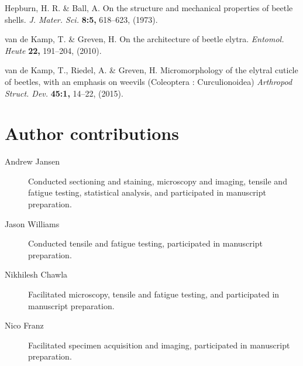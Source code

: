 \documentclass[twocolumn, linenumbers, superscriptaddress]{revtex4-1}
\begin{document}
\begin{thebibliography}{50}
				Hepburn, H. R. \& Ball, A.
				On the structure and mechanical properties of beetle shells.
				\textit{J. Mater. Sci.}
				\textbf{8:5,}
				618--623,
				(1973).
				
				van de Kamp, T. \& Greven, H.
				On the architecture of beetle elytra.
				\textit{Entomol. Heute}
				\textbf{22,}
				191--204,
				(2010).
			
				van de Kamp, T., Riedel, A. \& Greven, H.
				Micromorphology of the elytral cuticle of beetles, with an emphasis on weevils (Coleoptera : Curculionoidea)
				\textit{Arthropod Struct. Dev.}
				\textbf{45:1,}
				14--22,
				(2015).
			
	\end{thebibliography}

	\begin{acknowledgements}

	\end{acknowledgements}

	\section*{Author contributions}
		\begin{description}
		\item[Andrew Jansen] Conducted sectioning and staining, microscopy and imaging, tensile and fatigue testing, statistical analysis, and participated in manuscript preparation.
		\item[Jason Williams] Conducted tensile and fatigue testing, participated in manuscript preparation.
		\item[Nikhilesh Chawla] Facilitated microscopy, tensile and fatigue testing, and participated in manuscript preparation.
		\item[Nico Franz] Facilitated specimen acquisition and imaging, participated in manuscript preparation.
		\end{description} 
	
\end{document}
